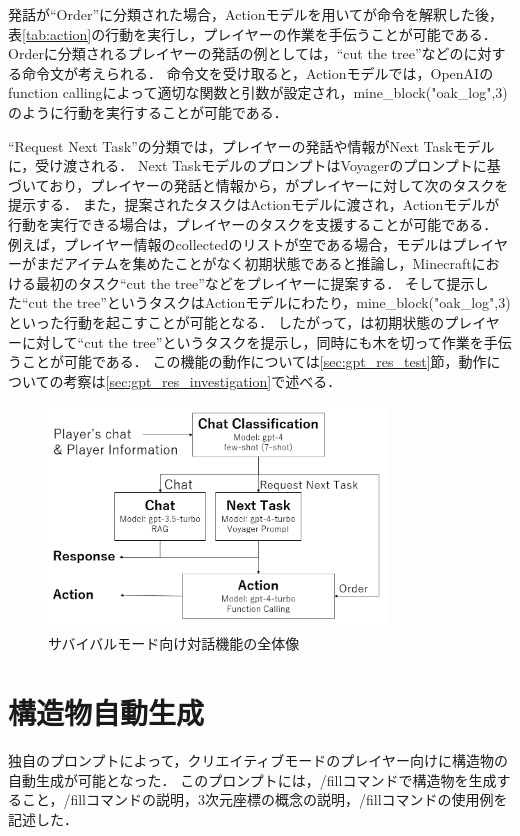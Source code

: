 発話が``Order''に分類された場合，Actionモデルを用いて{\mason}が命令を解釈した後，表\ref{tab:action}の行動を実行し，プレイヤーの作業を手伝うことが可能である．
Orderに分類されるプレイヤーの発話の例としては，``cut the tree''などの{\mason}に対する命令文が考えられる．
命令文を受け取ると，Actionモデルでは，OpenAIのfunction calling\cite{bib:function_calling}によって適切な関数と引数が設定され，mine\_block("oak\_log",3)のように行動を実行することが可能である．

``Request Next Task''の分類では，プレイヤーの発話や情報がNext Taskモデルに，受け渡される．
Next TaskモデルのプロンプトはVoyager\cite{bib:voyager}のプロンプトに基づいており，プレイヤーの発話と情報から，{\mason}がプレイヤーに対して次のタスクを提示する．
また，提案されたタスクはActionモデルに渡され，Actionモデルが行動を実行できる場合は，プレイヤーのタスクを支援することが可能である．
例えば，プレイヤー情報のcollectedのリストが空である場合，モデルはプレイヤーがまだアイテムを集めたことがなく初期状態であると推論し，Minecraftにおける最初のタスク``cut the tree''などをプレイヤーに提案する．
そして提示した``cut the tree''というタスクはActionモデルにわたり，mine\_block("oak\_log",3)といった行動を起こすことが可能となる．
したがって，{\mason}は初期状態のプレイヤーに対して``cut the tree''というタスクを提示し，同時に{\mason}も木を切って作業を手伝うことが可能である．
この機能の動作については\ref{sec:gpt_res_test}節，動作についての考察は\ref{sec:gpt_res_investigation}で述べる．

\begin{figure}[H]
    \centering
    \includegraphics[width=0.8\textwidth]{fig/interactive_function.PNG}
    \caption{サバイバルモード向け対話機能の全体像}
    \label{fig:interactive_function}
\end{figure}

\section{構造物自動生成}\label{sec:build_mode}
独自のプロンプトによって，クリエイティブモードのプレイヤー向けに構造物の自動生成が可能となった．
このプロンプトには，/fillコマンドで構造物を生成すること，/fillコマンドの説明，3次元座標の概念の説明，/fillコマンドの使用例を記述した．

